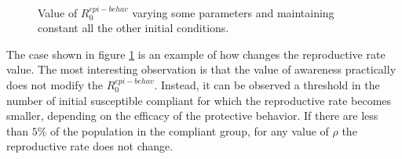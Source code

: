 \begin{figure}[ht]
	\centering
	 \quad
	 \\
	\caption[Epidemic behavioral $R_0$ coefficients ]{Value of $R_0^{epi-behav}$ varying some parameters and maintaining constant all the other initial conditions.}
	\label{fig:r0_epi_behav_coef}
\end{figure}


The case shown in figure \ref{fig:r0_epi_behav_coef} is an example of how changes the reproductive rate value. The most interesting observation is that the value of awareness practically does not modify the $R_0^{epi-behav}$. Instead, it can be observed a threshold in the number of initial susceptible compliant for which the reproductive rate becomes smaller, depending on the efficacy of the protective behavior. If there are less than $5\%$ of the population in the compliant group, for any value of $\rho$ the reproductive rate does not change. 